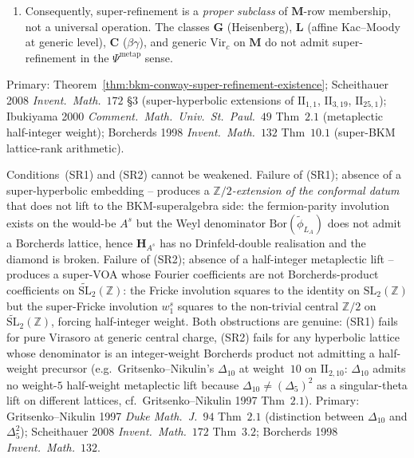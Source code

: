 \begin{corollary}
\begin{enumerate}[label=\textup{(\roman*)}]
BKM source on a hyperbolic lattice, so the super-refinement diamond
has empty bottom-left vertex.
\item Consequently, super-refinement is a \emph{proper subclass}
of $\mathbf{M}$-row membership, not a universal operation. The
classes $\mathbf{G}$ (Heisenberg), $\mathbf{L}$ (affine
Kac--Moody at generic level), $\mathbf{C}$ ($\beta\gamma$), and
generic $\mathrm{Vir}_c$ on $\mathbf{M}$ do not admit super-refinement
in the $\Psi^{\mathrm{metap}}$ sense.
\end{enumerate}
Primary:
Theorem~\ref{thm:bkm-conway-super-refinement-existence};
Scheithauer 2008 \emph{Invent.~Math.}~$172$ \S$3$
(super-hyperbolic extensions of $\mathrm{II}_{1,1}$,
$\mathrm{II}_{3,19}$, $\mathrm{II}_{25,1}$);
Ibukiyama 2000 \emph{Comment.~Math.~Univ.~St.~Paul.}~$49$ Thm~$2.1$
(metaplectic half-integer weight);
Borcherds 1998 \emph{Invent.~Math.}~$132$ Thm~$10.1$
(super-BKM lattice-rank arithmetic).
\end{corollary}

\begin{remark}
\label{rem:bkm-conway-super-refinement-necessity}
Conditions~(SR1) and (SR2) cannot be weakened.
Failure of (SR1); absence of a super-hyperbolic embedding --
produces a \emph{$\mathbb{Z}/2$-extension of the conformal datum}
that does not lift to the BKM-superalgebra side: the fermion-parity
involution exists on the would-be $A^{s}$ but the Weyl denominator
$\mathrm{Bor}(\widetilde\phi_{L_A})$ does not admit a Borcherds
lattice, hence $\mathbf{H}_{A^{s}}$ has no Drinfeld-double
realisation and the diamond is broken.
Failure of (SR2); absence of a half-integer metaplectic lift --
produces a super-VOA whose
Fourier coefficients are not Borcherds-product coefficients on
$\widetilde{\mathrm{SL}}_2(\mathbb{Z})$: the Fricke involution
squares to the identity on $\mathrm{SL}_2(\mathbb{Z})$ but the
super-Fricke involution $w_1^{s}$ squares to the non-trivial
central $\mathbb{Z}/2$ on $\widetilde{\mathrm{SL}}_2(\mathbb{Z})$,
forcing half-integer weight.
Both obstructions are genuine: (SR1) fails for pure Virasoro at
generic central charge, (SR2) fails for any hyperbolic lattice whose
denominator is an integer-weight Borcherds product not admitting a
half-weight precursor (e.g.\ Gritsenko--Nikulin's $\Delta_{10}$ at
weight~$10$ on $\mathrm{II}_{2,10}$: $\Delta_{10}$ admits no weight-$5$
half-weight metaplectic lift because
$\Delta_{10}\neq (\Delta_5)^2$ as a singular-theta lift on
different lattices, cf.\ Gritsenko--Nikulin 1997 Thm~$2.1$).
Primary:
Gritsenko--Nikulin 1997 \emph{Duke Math.~J.}~$94$ Thm~$2.1$
(distinction between $\Delta_{10}$ and $\Delta_5^2$);
Scheithauer 2008 \emph{Invent.~Math.}~$172$ Thm~$3.2$;
Borcherds 1998 \emph{Invent.~Math.}~$132$.
\end{remark}

